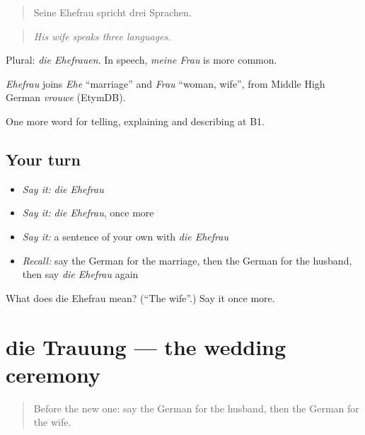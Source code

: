\begin{quote}
Seine Ehefrau spricht drei Sprachen.
\end{quote}

\begin{quote}
\emph{His wife speaks three languages.}
\end{quote}

Plural: \emph{die Ehefrauen}. In speech, \emph{meine Frau} is more common.

\begin{cousinweb}
\emph{Ehefrau} joins \emph{Ehe} \textquotedblleft{}marriage\textquotedblright{} and \emph{Frau} \textquotedblleft{}woman, wife\textquotedblright{}, from Middle High German \emph{vrouwe} (EtymDB).
\end{cousinweb}

\begin{grammarlens}[title={What you've built}]
One more word for telling, explaining and describing at B1.
\end{grammarlens}

\subsection*{Your turn}
\begin{itemize}
\raggedright
  \item \emph{Say it:} \emph{die Ehefrau}
  \item \emph{Say it:} \emph{die Ehefrau}, once more
  \item \emph{Say it:} a sentence of your own with \emph{die Ehefrau}
  \item \emph{Recall:} say the German for the marriage, then the German for the husband, then say \emph{die Ehefrau} again
\end{itemize}

\begin{tcolorbox}[breakable,colback=teal!4,colframe=teal!35!black,title={Before you move on}]
What does die Ehefrau mean? (\textquotedblleft{}The wife\textquotedblright{}.) Say it once more.
\end{tcolorbox}
\section[die Trauung]{die Trauung — the wedding ceremony}

\label{lesson:GE-C299-trauung}



\begin{quote}
Before the new one: say the German for the husband, then the German for the wife.
\end{quote}


